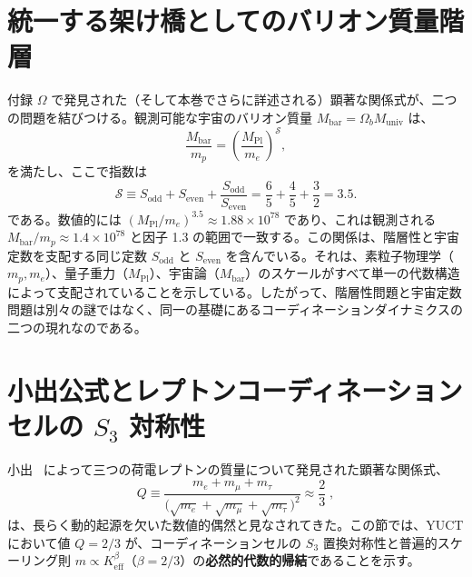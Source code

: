 \documentclass[11pt,a4paper]{article}
\theoremstyle{remark}
\begin{document}
	\section{統一する架け橋としてのバリオン質量階層}
	
	付録 $\Omega$ で発見された（そして本巻でさらに詳述される）顕著な関係式が、二つの問題を結びつける。観測可能な宇宙のバリオン質量 \(M_{\mathrm{bar}} = \Omega_b M_{\mathrm{univ}}\) は、
	\begin{equation}
		\frac{M_{\mathrm{bar}}}{m_p} = \left( \frac{M_{\mathrm{Pl}}}{m_e} \right)^{\mathcal{S}},
		\label{eq:baryon-hierarchy}
	\end{equation}
	を満たし、ここで指数は
	\begin{equation}
		\mathcal{S} \equiv S_{\mathrm{odd}} + S_{\mathrm{even}} + \frac{S_{\mathrm{odd}}}{S_{\mathrm{even}}} = \frac{6}{5} + \frac{4}{5} + \frac{3}{2} = 3.5.
	\end{equation}
	である。数値的には \((M_{\mathrm{Pl}}/m_e)^{3.5} \approx 1.88 \times 10^{78}\) であり、これは観測される \(M_{\mathrm{bar}}/m_p \approx 1.4 \times 10^{78}\) と因子 1.3 の範囲で一致する。この関係は、階層性と宇宙定数を支配する同じ定数 \(S_{\mathrm{odd}}\) と \(S_{\mathrm{even}}\) を含んでいる。それは、素粒子物理学（\(m_p, m_e\)）、量子重力（\(M_{\mathrm{Pl}}\)）、宇宙論（\(M_{\mathrm{bar}}\)）のスケールがすべて単一の代数構造によって支配されていることを示している。したがって、階層性問題と宇宙定数問題は別々の謎ではなく、同一の基礎にあるコーディネーションダイナミクスの二つの現れなのである。
	
	\section{小出公式とレプトンコーディネーションセルの \(S_3\) 対称性}
	\label{sec:koide}
	
	小出~\cite{Koide1983} によって三つの荷電レプトンの質量について発見された顕著な関係式、
	\begin{equation}
		Q \equiv \frac{m_e + m_\mu + m_\tau}{\bigl(\sqrt{m_e} + \sqrt{m_\mu} + \sqrt{m_\tau}\bigr)^2}
		\approx \frac{2}{3}\;,
	\end{equation}
	は、長らく動的起源を欠いた数値的偶然と見なされてきた。この節では、YUCT において値 \(Q=2/3\) が、コーディネーションセルの \(S_3\) 置換対称性と普遍的スケーリング則 \(m \propto K_{\mathrm{eff}}^{\beta}\)（\(\beta=2/3\)）の\textbf{必然的代数的帰結}であることを示す。
	
\end{document}
